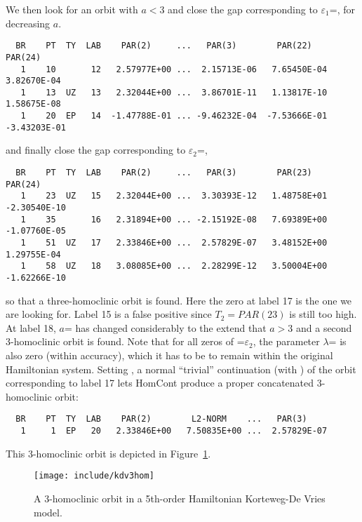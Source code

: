 \documentclass[12pt]{report}
\begin{document}
We then look for an orbit with $a<3$ and close the gap corresponding 
to $\varepsilon_1$=, for decreasing $a$.
\begin{center}
\end{center}
\begin{verbatim}
  BR    PT  TY  LAB    PAR(2)     ...   PAR(3)        PAR(22)       PAR(24)
   1    10       12   2.57977E+00 ...  2.15713E-06   7.65450E-04   3.82670E-04
   1    13  UZ   13   2.32044E+00 ...  3.86701E-11   1.13817E-10   1.58675E-08
   1    20  EP   14  -1.47788E-01 ... -9.46232E-04  -7.53666E-01  -3.43203E-01
\end{verbatim}
and finally close the gap corresponding to $\varepsilon_2$=,
\begin{center}
\end{center}
\begin{verbatim}
  BR    PT  TY  LAB    PAR(2)     ...   PAR(3)        PAR(23)       PAR(24)
   1    23  UZ   15   2.32044E+00 ...  3.30393E-12   1.48758E+01  -2.30540E-10
   1    35       16   2.31894E+00 ... -2.15192E-08   7.69389E+00  -1.07760E-05
   1    51  UZ   17   2.33846E+00 ...  2.57829E-07   3.48152E+00   1.29755E-04
   1    58  UZ   18   3.08085E+00 ...  2.28299E-12   3.50004E+00  -1.62266E-10
\end{verbatim}
so that a three-homoclinic orbit is found. Here the zero at label
17 is the one we are looking for. Label 15 is a false positive since
$T_2=PAR(23)$ is still too high. At label 18, $a$= 
has changed
considerably to the extend that $a>3$ and a second 3-homoclinic orbit 
is found. Note that for all zeros of =$\varepsilon_2$, the
parameter $\lambda$= is also zero (within \AUTO accuracy), 
which it has to be to remain
within the original Hamiltonian system.
Setting , a normal ``trivial'' continuation (with )
of the orbit corresponding to label 17
lets {\cal HomCont} produce a proper concatenated
3-homoclinic orbit:
\begin{center}
\end{center}
\begin{verbatim}
  BR    PT  TY  LAB    PAR(2)        L2-NORM    ...   PAR(3)     
   1     1  EP   20   2.33846E+00   7.50835E+00 ...  2.57829E-07
\end{verbatim}
This 3-homoclinic orbit is depicted in Figure~\ref{kdv3hom}.
\begin{figure}[htb]
\begin{center}
\texttt{[image: include/kdv3hom]}
\caption{A 3-homoclinic orbit in a 5th-order Hamiltonian 
Korteweg-De Vries model.}
\label{kdv3hom}
\end{center}
\end{figure}



 \label{sec:bibliography}
\end{document}
